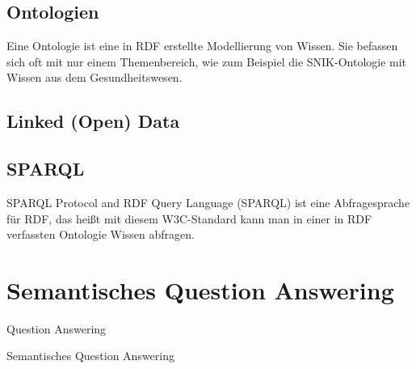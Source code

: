 \subsection{Ontologien}
Eine Ontologie ist eine in RDF erstellte Modellierung von Wissen.
Sie befassen sich oft mit nur einem Themenbereich, wie zum Beispiel die SNIK-Ontologie mit Wissen aus dem Gesundheitswesen.

\subsection{Linked (Open) Data}


\subsection{SPARQL}
SPARQL Protocol and RDF Query Language (SPARQL) ist eine Abfragesprache für RDF, das heißt mit diesem W3C-Standard kann man in einer in RDF verfassten Ontologie Wissen abfragen.

\section{Semantisches Question Answering}

\begin{definition}{Question Answering}

\end{definition}

\begin{definition}{Semantisches Question Answering}

\end{definition}
